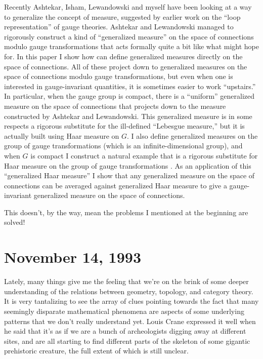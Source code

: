 \documentclass{article}
\begin{document}
Recently Ashtekar, Isham, Lewandowski and myself have been looking at a
way to generalize the concept of measure, suggested by earlier work on
the ``loop representation'' of gauge theories. Ashtekar and Lewandowski
managed to rigorously construct a kind of ``generalized measure'' on the
space of connections modulo gauge transformations that acts formally
quite a bit like what might hope for. In this paper I show how can
define generalized measures directly on the space of connections. All of
these project down to generalized measures on the space of connections
modulo gauge transformations, but even when one is interested in
gauge-invariant quantities, it is sometimes easier to work ``upstairs.''
In particular, when the gauge group is compact, there is a ``uniform''
generalized measure on the space of connections that projects down to
the measure constructed by Ashtekar and Lewandowski. This generalized
measure is in some respects a rigorous substitute for the ill-defined
``Lebesgue measure,'' but it is actually built using Haar measure on
\(G\). I also define generalized measures on the group of gauge
transformations (which is an infinite-dimensional group), and when \(G\)
is compact I construct a natural example that is a rigorous substitute
for Haar measure on the group of gauge transformations . As an
application of this ``generalized Haar measure'' I show that any
generalized measure on the space of connections can be averaged against
generalized Haar measure to give a gauge-invariant generalized measure
on the space of connections.

This doesn't, by the way, mean the problems I mentioned at the beginning
are solved!



\hypertarget{week25}{%
\section{November 14, 1993}\label{week25}}

Lately, many things give me the feeling that we're on the brink of some
deeper understanding of the relations between geometry, topology, and
category theory. It is very tantalizing to see the array of clues
pointing towards the fact that many seemingly disparate mathematical
phenomena are aspects of some underlying patterns that we don't really
understand yet. Louis Crane expressed it well when he said that it's as
if we are a bunch of archeologists digging away at different sites, and
are all starting to find different parts of the skeleton of some
gigantic prehistoric creature, the full extent of which is still
unclear.
\end{document}
